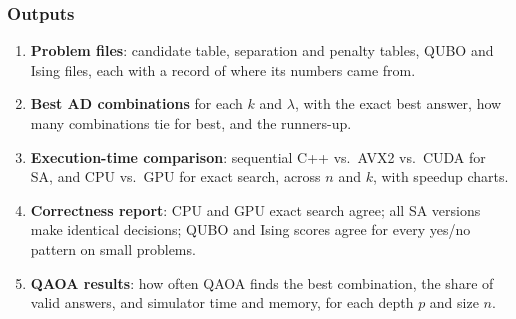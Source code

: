 \subsubsection{Outputs}

\begin{enumerate}
\item \textbf{Problem files}: candidate table, separation and penalty tables, QUBO and Ising files, each with a record of where its numbers came from.
\item \textbf{Best AD combinations} for each $k$ and $\lambda$, with the exact best answer, how many combinations tie for best, and the runners-up.
\item \textbf{Execution-time comparison}: sequential C++ vs.\ AVX2 vs.\ CUDA for SA, and CPU vs.\ GPU for exact search, across $n$ and $k$, with speedup charts.
\item \textbf{Correctness report}: CPU and GPU exact search agree; all SA versions make identical decisions; QUBO and Ising scores agree for every yes/no pattern on small problems.
\item \textbf{QAOA results}: how often QAOA finds the best combination, the share of valid answers, and simulator time and memory, for each depth $p$ and size $n$.
\end{enumerate}
